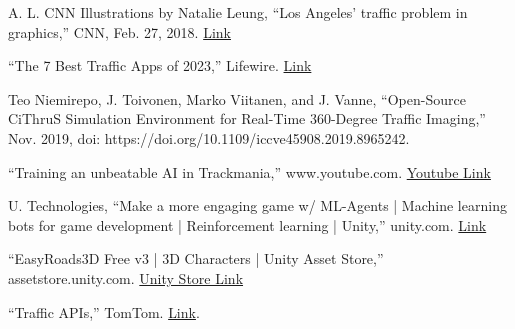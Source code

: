 \documentclass[a4paper,10pt]{article}
\begin{document}
    \begin{thebibliography}{}

     A. L. CNN Illustrations by Natalie Leung, ``Los Angeles' traffic problem in graphics,'' CNN, Feb. 27, 2018. \href{https://www.cnn.com/2018/02/27/americas/los-angeles-traffic/index.html}{Link}

     “The 7 Best Traffic Apps of 2023,” Lifewire. \href{https://www.lifewire.com/best-traffic-apps-4570916}{Link}

     Teo Niemirepo, J. Toivonen, Marko Viitanen, and J. Vanne, “Open-Source CiThruS Simulation Environment for Real-Time 360-Degree Traffic Imaging,” Nov. 2019, doi: https://doi.org/10.1109/iccve45908.2019.8965242.

     “Training an unbeatable AI in Trackmania,” www.youtube.com. \href{https://www.youtube.com/watch?v=Dw3BZ6O_8LY}{Youtube Link}

     U. Technologies, “Make a more engaging game w/ ML-Agents | Machine learning bots for game development | Reinforcement learning | Unity,” unity.com. \href{https://unity.com/products/machine-learning-agents}{Link}

     “EasyRoads3D Free v3 | 3D Characters | Unity Asset Store,” assetstore.unity.com. \href{https://assetstore.unity.com/packages/3d/characters/easyroads3d-free-v3-987}{Unity Store Link}

     “Traffic APIs,” TomTom. \href{https://www.tomtom.com/products/traffic-apis/}{Link}.

    \end{thebibliography}
\end{document}
